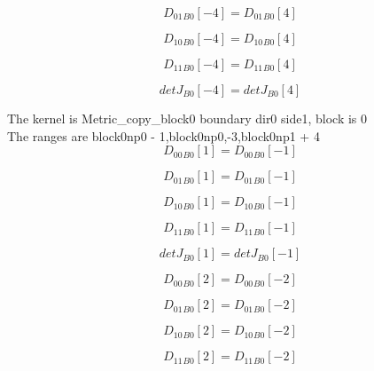 \documentclass{article}
\begin{document}
\begin{dmath}{D_{01}{_{B0}}}[{-4}] = {D_{01}{_{B0}}}[{4}]\end{dmath}

\begin{dmath}{D_{10}{_{B0}}}[{-4}] = {D_{10}{_{B0}}}[{4}]\end{dmath}

\begin{dmath}{D_{11}{_{B0}}}[{-4}] = {D_{11}{_{B0}}}[{4}]\end{dmath}

\begin{dmath}{detJ{_{B0}}}[{-4}] = {detJ{_{B0}}}[{4}]\end{dmath}

\noindent The kernel is Metric_copy_block0 boundary dir0 side1, block is 0\\\noindent The ranges are block0np0 - 1,block0np0,-3,block0np1 + 4\\\begin{dmath}{D_{00}{_{B0}}}[{1}] = {D_{00}{_{B0}}}[{-1}]\end{dmath}

\begin{dmath}{D_{01}{_{B0}}}[{1}] = {D_{01}{_{B0}}}[{-1}]\end{dmath}

\begin{dmath}{D_{10}{_{B0}}}[{1}] = {D_{10}{_{B0}}}[{-1}]\end{dmath}

\begin{dmath}{D_{11}{_{B0}}}[{1}] = {D_{11}{_{B0}}}[{-1}]\end{dmath}

\begin{dmath}{detJ{_{B0}}}[{1}] = {detJ{_{B0}}}[{-1}]\end{dmath}

\begin{dmath}{D_{00}{_{B0}}}[{2}] = {D_{00}{_{B0}}}[{-2}]\end{dmath}

\begin{dmath}{D_{01}{_{B0}}}[{2}] = {D_{01}{_{B0}}}[{-2}]\end{dmath}

\begin{dmath}{D_{10}{_{B0}}}[{2}] = {D_{10}{_{B0}}}[{-2}]\end{dmath}

\begin{dmath}{D_{11}{_{B0}}}[{2}] = {D_{11}{_{B0}}}[{-2}]\end{dmath}
\end{document}
